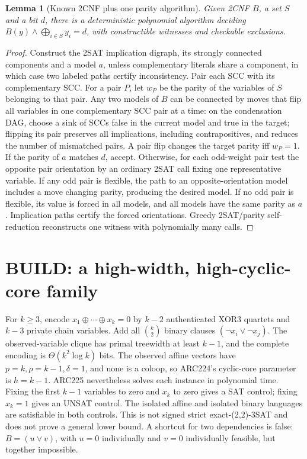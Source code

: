 \documentclass[11pt]{article}
\newtheorem{lemma}[theorem]{Lemma}
\begin{document}
\begin{lemma}[Known 2CNF plus one parity algorithm]
Given 2CNF \(B\), a set \(S\) and a bit \(d\), there is a deterministic polynomial algorithm deciding \(B(y)\wedge\bigoplus_{i\in S}y_i=d\), with constructible witnesses and checkable exclusions.
\end{lemma}
\begin{proof}
Construct the 2SAT implication digraph, its strongly connected components and a model \(a\), unless complementary literals share a component, in which case two labeled paths certify inconsistency. Pair each SCC with its complementary SCC. For a pair \(P\), let \(w_P\) be the parity of the variables of \(S\) belonging to that pair. Any two models of \(B\) can be connected by moves that flip all variables in one complementary SCC pair at a time: on the condensation DAG, choose a sink of SCCs false in the current model and true in the target; flipping its pair preserves all implications, including contrapositives, and reduces the number of mismatched pairs. A pair flip changes the target parity iff \(w_P=1\). If the parity of \(a\) matches \(d\), accept. Otherwise, for each odd-weight pair test the opposite pair orientation by an ordinary 2SAT call fixing one representative variable. If any odd pair is flexible, the path to an opposite-orientation model includes a move changing parity, producing the desired model. If no odd pair is flexible, its value is forced in all models, and all models have the same parity as \(a\). Implication paths certify the forced orientations. Greedy 2SAT/parity self-reduction reconstructs one witness with polynomially many calls.
\end{proof}
\section{BUILD: a high-width, high-cyclic-core family}
For \(k\ge3\), encode \(x_1\oplus\cdots\oplus x_k=0\) by \(k-2\) authenticated XOR3 quartets and \(k-3\) private chain variables. Add all \(\binom{k}{2}\) binary clauses \((\neg x_i\vee\neg x_j)\). The observed-variable clique has primal treewidth at least \(k-1\), and the complete encoding is \(\Theta(k^2\log k)\) bits. The observed affine vectors have \(p=k,\rho=k-1,\delta=1\), and none is a coloop, so ARC224's cyclic-core parameter is \(h=k-1\). ARC225 nevertheless solves each instance in polynomial time. Fixing the first \(k-1\) variables to zero and \(x_k\) to zero gives a SAT control; fixing \(x_k=1\) gives an UNSAT control. The isolated affine and isolated binary languages are satisfiable in both controls. This is not signed strict exact-(2,2)-3SAT and does not prove a general lower bound. A shortcut for two dependencies is false: \(B=(u\vee v)\), with \(u=0\) individually and \(v=0\) individually feasible, but together impossible.
\end{document}
